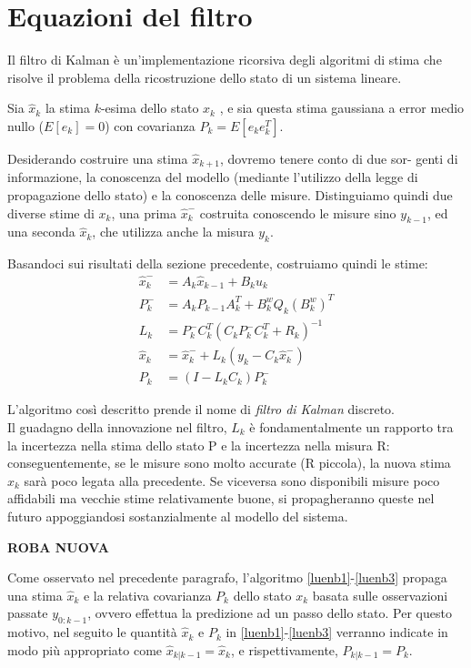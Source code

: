 \section{Equazioni del filtro}

Il filtro di Kalman è un'implementazione ricorsiva degli algoritmi di stima che risolve il problema della ricostruzione dello stato di un sistema lineare.

Sia $\hat{x}_k$ la stima $k$-esima dello stato $x_k$ , e sia questa stima gaussiana a error medio nullo ($E[e_k] = 0$) con covarianza $P_k=E[e_ke_k^T]$.

Desiderando costruire una stima $\hat{x}_{k+1}$, dovremo tenere conto di due sor-
genti di informazione, la conoscenza del modello (mediante l’utilizzo della
legge di propagazione dello stato) e la conoscenza delle misure. Distinguiamo
quindi due diverse stime di $x_k$, una prima $\hat{x}_k^-$ costruita conoscendo le misure sino $y_{k-1}$, ed una seconda $\hat{x}_k$, che utilizza anche la misura $y_{k}$.

Basandoci sui risultati della sezione precedente, costruiamo quindi le stime:
\begin{align}
\hat{x}_k^- &= A_k\hat{x}_{k-1} + B_ku_k \\
P_k^- &= A_kP_{k-1}A_k^T + B^w_kQ_k(B^w_k)^T \\
L_k &= P_k^-C_k^T(C_kP_k^-C_k^T + R_k)^{-1}\\
\hat{x}_k &= \hat{x}_k^- + L_k(y_k - C_k\hat{x}_k^-)\\
P_k &= (I - L_kC_k)P_k^-
\end{align}

L’algoritmo così descritto prende il nome di \textit{filtro di Kalman} discreto. \\ Il guadagno della innovazione nel filtro, $L_k$ è fondamentalmente un rapporto tra la incertezza nella stima dello stato P e la incertezza nella misura R: conseguentemente, se le misure sono molto accurate (R piccola), la nuova stima $\hat{x}_k$ sarà poco legata alla precedente. Se viceversa sono disponibili misure poco affidabili ma vecchie stime relativamente buone, si propagheranno queste nel futuro appoggiandosi sostanzialmente al modello del sistema.

\newpage

\textbf{ROBA NUOVA}

Come osservato nel precedente paragrafo, l’algoritmo \eqref{luenb1}-\eqref{luenb3} propaga una stima $\hat{x}_k$ e la relativa covarianza $P_k$ dello stato $x_k$ basata sulle osservazioni passate $y_{0:k-1}$, ovvero effettua la predizione ad un passo dello stato. Per questo motivo, nel seguito le quantità $\hat{x}_k$ e $P_k$ in \eqref{luenb1}-\eqref{luenb3} verranno indicate in modo più appropriato come $\hat{x}_{k|k-1}=\hat{x}_k$, e rispettivamente, $P_{k|k-1}=P_k$.

